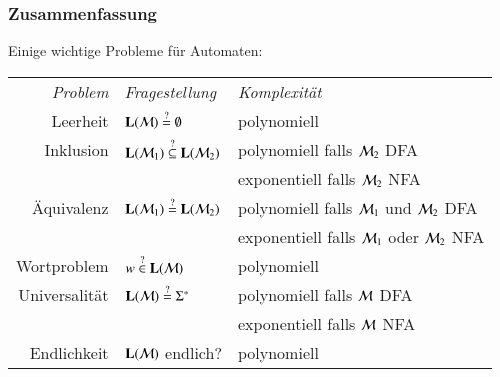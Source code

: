 \documentclass[aspectratio=1610,onlymath]{beamer}
\begin{document}
\maketitle


\begin{frame}\frametitle{Zusammenfassung}

Einige wichtige Probleme für Automaten:\bigskip

\begin{tabular}{@{}rll@{}}
\emph{Problem} & \emph{Fragestellung} & \emph{Komplexität} \\[1ex]
Leerheit & $\textbf{\textcolor{black}{L}}(\mathcal{M})\stackrel{?}{=}\emptyset$  & polynomiell\\[1ex]
Inklusion & $\textbf{\textcolor{black}{L}}(\mathcal{M}_1)\stackrel{?}{\subseteq}\textbf{\textcolor{black}{L}}(\mathcal{M}_2)$  & polynomiell falls $\mathcal{M}_2$ DFA\\[-0.5ex]
	& & exponentiell falls $\mathcal{M}_2$ NFA\\[1ex]
Äquivalenz & $\textbf{\textcolor{black}{L}}(\mathcal{M}_1)\stackrel{?}{=}\textbf{\textcolor{black}{L}}(\mathcal{M}_2)$  & polynomiell falls $\mathcal{M}_1$ und $\mathcal{M}_2$ DFA\\[-0.5ex]
	& & exponentiell falls $\mathcal{M}_1$ oder $\mathcal{M}_2$ NFA\\[1ex]
Wortproblem & $w\stackrel{?}{\in}\textbf{\textcolor{black}{L}}(\mathcal{M})$  & polynomiell\\[1ex]
Universalität & $\textbf{\textcolor{black}{L}}(\mathcal{M})\stackrel{?}{=}\Sigma^*$  & polynomiell falls $\mathcal{M}$ DFA\\[-0.5ex]
	& & exponentiell falls $\mathcal{M}$ NFA\\[1ex]
Endlichkeit & $\textbf{\textcolor{black}{L}}(\mathcal{M})$ endlich? & polynomiell 
\end{tabular}

\end{frame}


\end{document}
